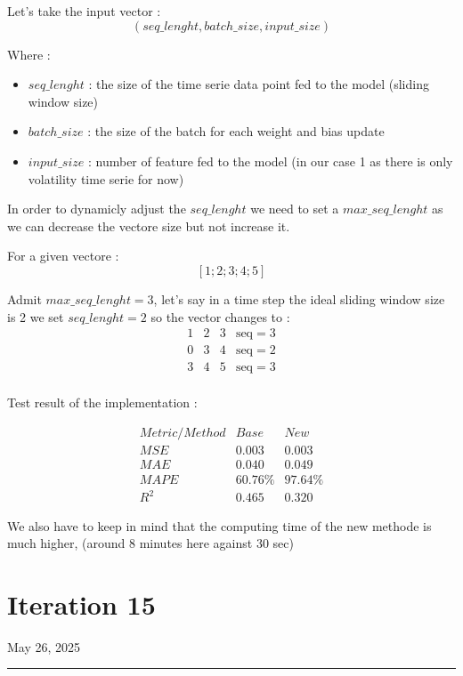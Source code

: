 \documentclass[letterpaper,11pt]{article}
\begin{document}
Let's take the input vector :
\[
(seq\_lenght, batch\_size, input\_size)
\]

Where :
\begin{itemize}
  \item $seq\_lenght$ : the size of the time serie data point fed to the model (sliding window size)
  \item $batch\_size$ : the size of the batch for each weight and bias update
  \item $input\_size$ : number of feature fed to the model (in our case 1 as there is only volatility time serie for now)
\end{itemize}

\bigskip
In order to dynamicly adjust the $seq\_lenght$ we need to set a $max\_seq\_lenght$ as we can decrease the vectore size but not increase it.

For a given vectore :
\[
[1; 2; 3; 4; 5]
\]


Admit $max\_seq\_lenght = 3 $, let's say in a time step the ideal sliding window size is 2 we set $seq\_lenght = 2$ so the vector changes to :
\[
\begin{array}{cccc}
1 & 2 & 3 & \text{seq} = 3 \\
0 & 3 & 4 & \text{seq} = 2 \\
3 & 4 & 5 & \text{seq} = 3 \\
\end{array}
\]


\bigskip

Test result of the implementation : 

\bigskip
\[
\begin{array}{ccc}
Metric/Method & Base & New \\
\hline
MSE & 0.003 & 0.003\\
MAE & 0.040 & 0.049 \\
MAPE & 60.76\% & 97.64\%  \\
R^{2} & 0.465 & 0.320 
\end{array}
\]

\bigskip


We also have to keep in mind that the computing time of the new methode is much higher, (around 8 minutes here against 30 sec)







\newpage
\section*{Iteration 15}
\begin{flushright}
May 26, 2025
\end{flushright}
\hrule
\vspace{0.2in}
\end{document}
